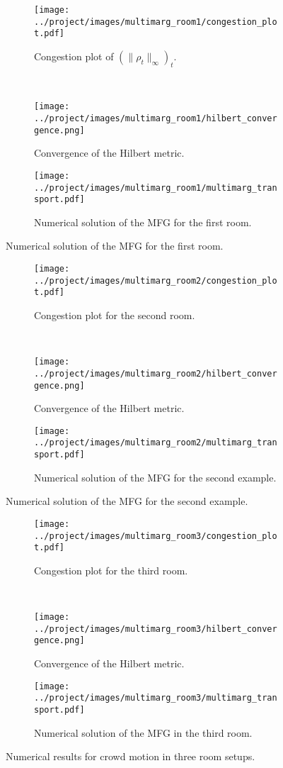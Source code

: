 \documentclass[../report.tex]{subfiles}
\begin{document}
\begin{figure}[h]
	\centering
	\begin{subfigure}[c]{.4\linewidth}
	\texttt{[image: ../project/images/multimarg\_room1/congestion\_plot.pdf]}
	\caption{Congestion plot of $(\|\rho_t\|_\infty)_t$.}
	\end{subfigure}~
	\begin{subfigure}[c]{.4\linewidth}
		\texttt{[image: ../project/images/multimarg\_room1/hilbert\_convergence.png]}
		\caption{Convergence of the Hilbert metric.}
	\end{subfigure}
	\begin{subfigure}[c]{.6\linewidth}
		\texttt{[image: ../project/images/multimarg\_room1/multimarg\_transport.pdf]}
		\caption{Numerical solution of the MFG for the first room.}\label{fig:NMargEx1Soltn}
	\end{subfigure}
\end{figure}
\begin{figure}
	\centering
	\begin{subfigure}[c]{.4\linewidth}
		\texttt{[image: ../project/images/multimarg\_room2/congestion\_plot.pdf]}
		\caption{Congestion plot for the second room.}\label{fig:Room2CongestPlot}
	\end{subfigure}~
	\begin{subfigure}[c]{.4\linewidth}
		\texttt{[image: ../project/images/multimarg\_room2/hilbert\_convergence.png]}
		\caption{Convergence of the Hilbert metric.}
	\end{subfigure}
	\begin{subfigure}[c]{.6\linewidth}
		\texttt{[image: ../project/images/multimarg\_room2/multimarg\_transport.pdf]}
		\caption{Numerical solution of the MFG for the second example.}\label{fig:NMargEx2}
	\end{subfigure}
\end{figure}
\begin{figure}
	\centering
	\begin{subfigure}[c]{.4\linewidth}
		\texttt{[image: ../project/images/multimarg\_room3/congestion\_plot.pdf]}\caption{Congestion plot for the third room.}
	\end{subfigure}~
	\begin{subfigure}[c]{.4\linewidth}
		\texttt{[image: ../project/images/multimarg\_room3/hilbert\_convergence.png]}
		\caption{Convergence of the Hilbert metric.}
	\end{subfigure}
	\begin{subfigure}[c]{.6\linewidth}
		\texttt{[image: ../project/images/multimarg\_room3/multimarg\_transport.pdf]}
		\caption{Numerical solution of the MFG in the third room.}\label{fig:NMargEx3}
	\end{subfigure}
	\caption{Numerical results for crowd motion in three room setups.}
\end{figure}
\end{document}
